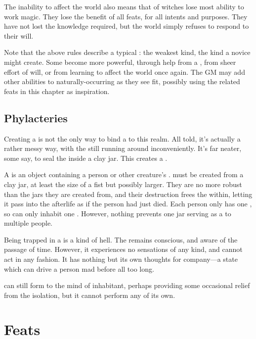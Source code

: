 The inability to affect the world also means that {\ghosts} of witches lose most ability to work magic.
They lose the benefit of all feats, for all intents and purposes.
They have not lost the knowledge required, but the world simply refuses to respond to their will.

Note that the above rules describe a typical {\ghost}: the weakest kind, the kind a novice  might create.
Some {\ghosts} become more powerful, through help from a , from sheer effort of will, or from learning to affect the world once again.
The GM may add other abilities to naturally-occurring {\ghosts} as they see fit, possibly using the {\ghost} related feats in this chapter as inspiration.

\subsection{Phylacteries}

Creating a {\ghost} is not the only way to bind a {\soul} to this realm.
All told, it's actually a rather messy way, with the {\soul} still running around inconveniently.
It's far neater, some  say, to seal the {\soul} inside a clay jar.
This creates a {\phylactery}.

A {\phylactery} is an object containing a person or other creature's {\soul}.
\capital{\phylacteries} must be created from a clay jar, at least the size of a fist but possibly larger.
They are no more robust than the jars they are created from, and their destruction frees the {\soul} within, letting it pass into the afterlife as if the person had just died.
Each person only has one {\soul}, so can only inhabit one {\phylactery}.
However, nothing prevents one jar serving as a {\phylactery} to multiple people.

Being trapped in a {\phylactery} is a kind of hell.
The {\soul} remains conscious, and aware of the passage of time.
However, it experiences no sensations of any kind, and cannot act in any fashion.
It has nothing but its own thoughts for company---a state which can drive a person mad before all too long.

 can still form {\interfaces} to the mind of {\phylacterypossessive} inhabitant, perhaps providing some occasional relief from the isolation, but it cannot perform any  of its own.

\section{Feats}


